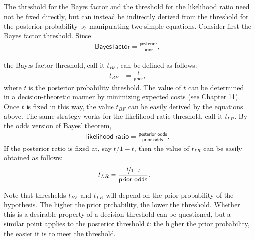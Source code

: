\documentclass[
  10pt,
  dvipsnames,enabledeprecatedfontcommands]{scrartcl}
\begin{document}
The threshold for the Bayes factor and the threshold for the likelihood
ratio need not be fixed directly, but can instead be indirectly derived
from the threshold for the posterior probability by manipulating two
simple equations. Consider first the Bayes factor threshold. Since
\begin{align*}
\mathsf{ Bayes \: factor }=\frac{\mathsf{posterior }}{\mathsf{ prior}},
\end{align*}

\noindent the Bayes factor threshold, call it \(t_{BF}\), can be defined
as follows: \begin{align*}t_{BF} & = \frac{t}{\textsf{prior}},
\end{align*} where \(t\) is the posterior probability threshold. The
value of \(t\) can be determined in a decision-theoretic manner by
minimizing expected costs (see Chapter 11). Once \(t\) is fixed in this
way, the value \(t_{BF}\) can be easily derived by the equations above.
The same strategy works for the likelihood ratio threshold, call it
\(t_{LR}\). By the odds version of Bayes' theorem,
\begin{align*}\textsf{likelihood ratio}=\frac{\textsf{posterior odds}}{\textsf{prior odds}}.
\end{align*} If the posterior ratio is fixed at, say \(t/1-t\), then the
value of \(t_{LR}\) can be easily obtained as follows:
\begin{align*}t_{LR} & = \frac{\nicefrac{t}{1-t}}{\textsf{prior odds}}.
\end{align*}

\noindent Note that thresholds \(t_{BF}\) and \(t_{LR}\) will depend on
the prior probability of the hypothesis. The higher the prior
probability, the lower the threshold. Whether this is a desirable
property of a decision threshold can be questioned, but a similar point
applies to the posterior threshold \(t\): the higher the prior
probability, the easier it is to meet the threshold.
\end{document}
